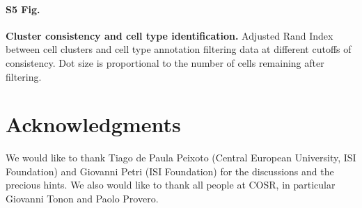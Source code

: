 \documentclass[10pt,letterpaper]{article}
\begin{document}
\paragraph*{S5 Fig.}
\label{S5_Fig}
{\bf Cluster consistency and cell type identification.} Adjusted Rand Index between cell clusters and cell type annotation filtering data at different cutoffs of consistency. Dot size is proportional to the number of cells remaining after filtering.

\section*{Acknowledgments}
We would like to thank Tiago de Paula Peixoto (Central European University, ISI Foundation) and Giovanni Petri (ISI Foundation) for the discussions and the precious hints. We also would like to thank all people at COSR, in particular Giovanni Tonon and Paolo Provero.

\nolinenumbers
\end{document}
